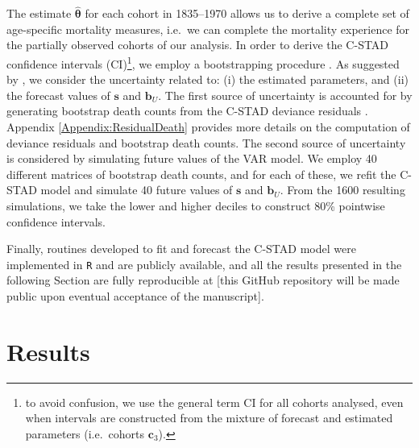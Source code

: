 \documentclass[11pt, a4paper]{article}
\begin{document}
The estimate $\hat{\bm{\theta}}$ for each cohort in 1835--1970 allows us to derive a complete set of age-specific mortality measures, i.e.~we can complete the mortality experience for the partially observed cohorts of our analysis. In order to derive the C-STAD confidence intervals (CI)\footnote{to avoid confusion, we use the general term CI for all cohorts analysed, even when intervals are constructed from the mixture of forecast and estimated parameters (i.e.~cohorts $\bm{c}_3$).}, we employ a bootstrapping procedure \citep{efron1994introduction}. As suggested by \cite{keilman2006prediction}, we consider the uncertainty related to: (i) the estimated parameters, and (ii) the forecast values of $\bm{s}$ and $\bm{b}_U$. The first source of uncertainty is accounted for by generating bootstrap death counts from the C-STAD deviance residuals \cite[as in, for example,][]{koissi2006evaluating,renshaw2008simulation,ouellette2012regional}. Appendix \ref{Appendix:ResidualDeath} provides more details on the computation of deviance residuals and bootstrap death counts. The second source of uncertainty is considered by simulating future values of the VAR model. We employ 40 different matrices of bootstrap death counts, and for each of these, we refit the C-STAD model and simulate 40 future values of $\bm{s}$ and $\bm{b}_U$. From the 1600 resulting simulations, we take the lower and higher deciles to construct 80\% pointwise confidence intervals.

Finally, routines developed to fit and forecast the C-STAD model were implemented in \texttt{R} \citep{Rcite} and are publicly available, and all the results presented in the following Section are fully reproducible at [this GitHub repository will be made public upon eventual acceptance of the manuscript]. 

\section{Results}
\label{Sec:Results}
\end{document}
